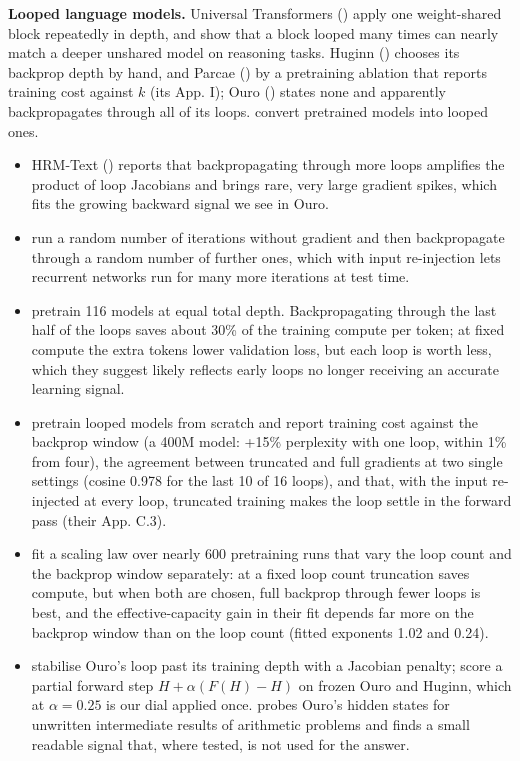 \documentclass[10pt]{article}
\begin{document}
\textbf{Looped language models.} Universal Transformers (\citealp{dehghani2019ut}) apply one weight-shared block repeatedly in depth, and \citet{saunshi2025looped} show that a block looped many times can nearly match a deeper unshared model on reasoning tasks. Huginn (\citealp{geiping2025}) chooses its backprop depth by hand, and Parcae (\citealp{prairie2026parcae}) by a pretraining ablation that reports training cost against $k$ (its App. I); Ouro (\citealp{zhu2025ouro}) states none and apparently backpropagates through all of its loops. \citet{mcleish2025} convert pretrained models into looped ones.

\begin{itemize}
\item HRM-Text (\citealp[App.~C.1]{wang2026hrm}) reports that backpropagating through more loops amplifies the product of loop Jacobians and brings rare, very large gradient spikes, which fits the growing backward signal we see in Ouro.
\item \citet{bansal2022} run a random number of iterations without gradient and then backpropagate through a random number of further ones, which with input re-injection lets recurrent networks run for many more iterations at test time.
\item \citet{schwethelm2026a} pretrain 116 models at equal total depth. Backpropagating through the last half of the loops saves about 30\% of the training compute per token; at fixed compute the extra tokens lower validation loss, but each loop is worth less, which they suggest likely reflects early loops no longer receiving an accurate learning signal.
\item \citet{huang2026partii} pretrain looped models from scratch and report training cost against the backprop window (a 400M model: +15\% perplexity with one loop, within 1\% from four), the agreement between truncated and full gradients at two single settings (cosine 0.978 for the last 10 of 16 loops), and that, with the input re-injected at every loop, truncated training makes the loop settle in the forward pass (their App. C.3).
\item \citet{xiong2026truncate} fit a scaling law over nearly 600 pretraining runs that vary the loop count and the backprop window separately: at a fixed loop count truncation saves compute, but when both are chosen, full backprop through fewer loops is best, and the effective-capacity gain in their fit depends far more on the backprop window than on the loop count (fitted exponents 1.02 and 0.24).
\item \citet{yang2026stars} stabilise Ouro's loop past its training depth with a Jacobian penalty; \citet{guo2026} score a partial forward step $H + \alpha(F(H) - H)$ on frozen Ouro and Huginn, which at $\alpha = 0.25$ is our dial applied once. \citet{shalevmerin2026present} probes Ouro's hidden states for unwritten intermediate results of arithmetic problems and finds a small readable signal that, where tested, is not used for the answer.
\end{itemize}
\end{document}
